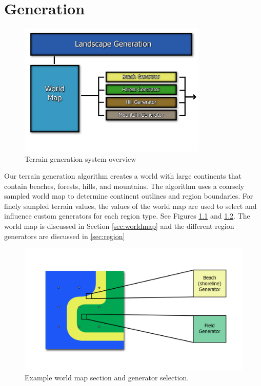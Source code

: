 
\chapter{Generation} \label{generation}

\begin{figure}
  \centering
    \includegraphics[width=0.8\textwidth]{figures/GeneratorSystem}
  \caption{Terrain generation system overview}
  \label{fig:gen_overview}
\end{figure}

Our terrain generation algorithm creates a world with large continents that contain beaches, forests, hills, and mountains.
The algorithm uses a coarsely sampled world map to determine continent outlines and region boundaries.
For finely sampled terrain values, the values of the world map are used to select and influence custom generators for each region type.
See Figures \ref{fig:gen_overview} and \ref{fig:worldmap}.
The world map is discussed in Section \ref{sec:worldmap} and the different region generators are discussed in \ref{sec:region}

\begin{figure}
	\centering
		\includegraphics[width=1.0\textwidth]{figures/worldmap.png}
	\caption{Example world map section and generator selection.}
	\label{fig:worldmap}
\end{figure}

